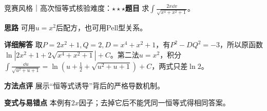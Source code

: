 \begin{example}{竞赛风格｜高次恒等式核验}{难度：$\star\star\star$}\label{deep:ex:integral_source_deep:pellcase}\textbf{题目} 求$\int\frac{2x\dd x}{\sqrt{x^4+x^2+1}}$。\par\textbf{思路} 可用$u=x^2$后配方，也可用Pell型关系。\par\textbf{详细解答} 取$P=2x^2+1,Q=2,D=x^4+x^2+1$，有$P^2-DQ^2=-3$，所以原函数$\ln|2x^2+1+2\sqrt{x^4+x^2+1}|+C$。第二法$u=x^2$，积分$\int\frac{\dd u}{\sqrt{u^2+u+1}}=\ln(u+\frac{1}{2}+\sqrt{u^2+u+1})+C$，两式只差$\ln2$。\par\textbf{方法点评} 展示“恒等式诱导”背后的严格导数机制。\par\textbf{变式与易错点} 本例有$2x$因子；去掉它后不能凭同一恒等式得相同答案。\end{example}
